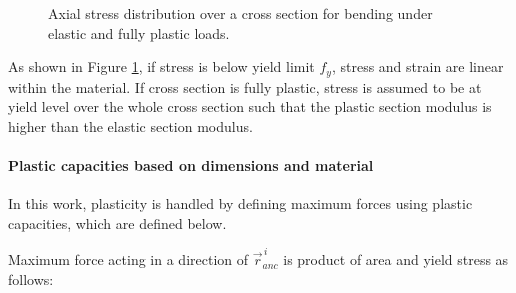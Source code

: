 \documentclass{jcgt}
\begin{document}
\begin{figure}[htb!]
\centering
{}
\hspace{1cm}
\caption{Axial stress distribution over a cross section for bending under elastic and fully plastic loads.}
\label{fig:wp}
\end{figure}

As shown in Figure \ref{fig:wp}, if stress is below yield limit $f_y$, stress and strain are linear within the material.
If cross section is fully plastic, stress is assumed to be at yield level over the whole cross section such that 
the plastic section modulus is higher than the elastic section modulus.

\paragraph{Plastic capacities based on dimensions and material}
In this work, plasticity is handled by defining maximum forces using plastic capacities, which are defined below.

Maximum force acting in a direction of $\vec{r}_{anc}^{\,i} $
is product of area and yield stress as follows:
\end{document}
